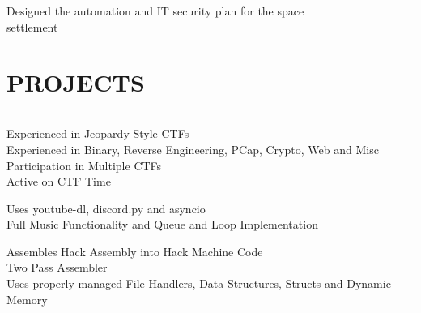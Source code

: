 \documentclass[]{resume}
\begin{document}
\begin{minipage}[t]{0.66\textwidth}
    \vspace{8pt}
     
    \vspace{4pt}
    \begin{minipage}{0.85\textwidth\vspace{4pt}}
        Designed the automation and IT security plan for the space\\settlement
    \end{minipage}



    \section{PROJECTS}
    \noindent\rule{12.5 cm}{0.4pt}

     
    \vspace{4pt}
    \begin{minipage}{0.85\textwidth\vspace{2pt}}
        Experienced in Jeopardy Style CTFs\\
        Experienced in Binary, Reverse Engineering, PCap, Crypto, Web and Misc\\
        Participation in Multiple CTFs\\
        Active on CTF Time
    \end{minipage}

    \vspace{8pt}
     
    \vspace{4pt}
    \begin{minipage}{0.85\textwidth\vspace{2pt}}
        Uses youtube-dl, discord.py and asyncio\\
        Full Music Functionality and Queue and Loop Implementation
    \end{minipage}

    \vspace{8pt}
     
    \vspace{4pt}
    \begin{minipage}{0.85\textwidth\vspace{2pt}}
        Assembles Hack Assembly into Hack Machine Code\\
        Two Pass Assembler\\
        Uses properly managed File Handlers, Data Structures, Structs and Dynamic Memory
    \end{minipage}

\end{minipage}
\end{document}
